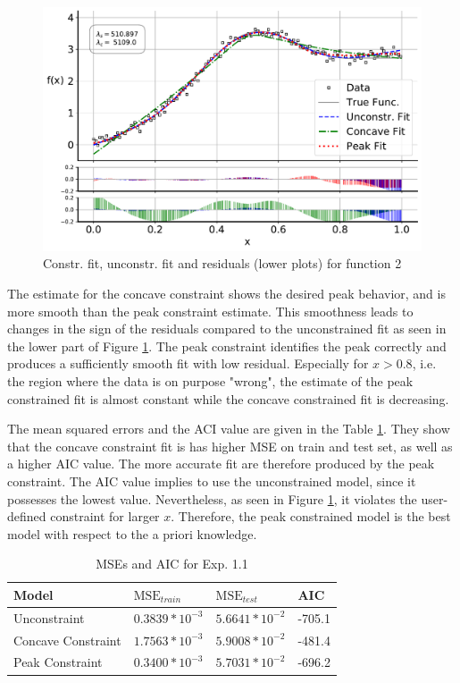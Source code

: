 \documentclass[10pt,a4paper]{article}
\begin{document}
\begin{figure}[H]
	\centering
	\includegraphics[width=\columnwidth]{../thesisplots/exp_peak_fit.pdf}
	\caption{Constr. fit, unconstr. fit and residuals (lower plots) for function 2}
	\label{fig:test_func_2_fit}
\end{figure}
 
The estimate for the concave constraint shows the desired peak behavior, and is more smooth than the peak constraint estimate. This smoothness leads to changes in the sign of the residuals compared to the unconstrained fit as seen in the lower part of Figure \ref{fig:test_func_2_fit}. The peak constraint identifies the peak correctly and produces a sufficiently smooth fit with low residual. Especially for $x >0.8$, i.e. the region where the data is on purpose "wrong", the estimate of the peak constrained fit is almost constant while the concave constrained fit is decreasing. 

The mean squared errors and the ACI value are given in the Table \ref{tab:metrics_1-2}. They show that the concave constraint fit is has higher MSE on train and test set, as well as a higher AIC value. The more accurate fit are therefore produced by the peak constraint. The AIC value implies to use the unconstrained model, since it possesses the lowest value. Nevertheless, as seen in Figure \ref{fig:test_func_2_fit}, it violates the user-defined constraint for larger $x$. Therefore, the peak constrained model is the best model with respect to the a priori knowledge. 

\begin{table}[h]
	\centering
	\begin{tabular}{|l|l|l|l|}
		\hline
		\textbf{Model} & \textbf{$\text{MSE}_{train}$} & \textbf{$\text{MSE}_{test}$}  & \textbf{AIC} \\ \hline \toprule
		Unconstraint        & $0.3839 * 10^{-3}$   & $5.6641 * 10^{-2}$ & -705.1       \\ \hline
		Concave Constraint  & $1.7563 * 10^{-3}$   & $5.9008 * 10^{-2}$ & -481.4       \\ \hline 
		Peak Constraint     & $0.3400 * 10^{-3}$   & $5.7031 * 10^{-2}$ & -696.2       \\ \hline \bottomrule
	\end{tabular}
	\caption{MSEs and AIC for Exp. 1.1}
	\label{tab:metrics_1-2}
\end{table}
\end{document}
